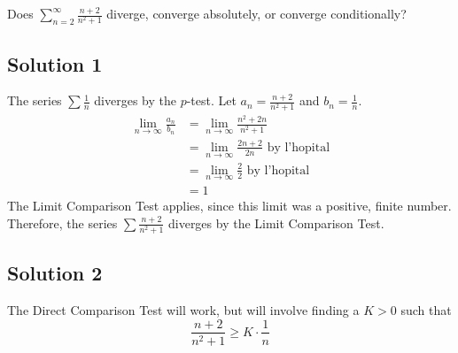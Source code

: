 \documentclass{article}
\begin{document}
\noindent
Does $\displaystyle \sum_{n=2}^\infty \frac{n+2}{n^2+1}$
diverge, converge absolutely, or converge conditionally?

\subsection*{Solution 1}

The series $\sum \frac1{n}$ diverges by the $p$-test. Let $a_n = \frac{n+2}{n^2+1}$ and $b_n = \frac1{n}$.
\begin{align*}
\lim_{n \to \infty} \frac{a_n}{b_n}
&= \lim_{n \to \infty} \frac{n^2+2n}{n^2+1}\\
&= \lim_{n \to \infty} \frac{2n+2}{2n} \text{ by l'hopital}\\
&= \lim_{n \to \infty} \frac{2}{2} \text{ by l'hopital}\\
&= 1
\end{align*}
The Limit Comparison Test applies, since this limit was a positive, finite number. Therefore, the series $\sum \frac{n+2}{n^2+1}$ diverges by the Limit Comparison Test.


\subsection*{Solution 2}

The Direct Comparison Test will work, but will involve finding a $K >0$ such that 
\[ \frac{n+2}{n^2+1} \geq K \cdot \frac{1}{n}\]
\end{document}
